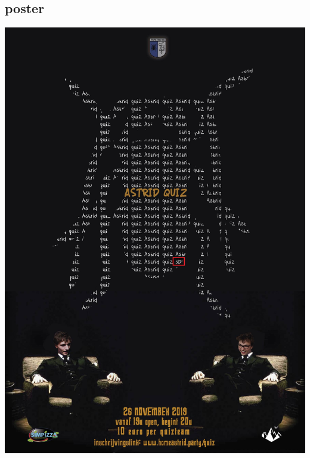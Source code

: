 \documentclass{exam}
\begin{document}
\begin{appendices}
\section{poster}
\begin{center}
\includegraphics[scale=0.35]{quiz}
\end{center}

\end{appendices}
\end{document}
